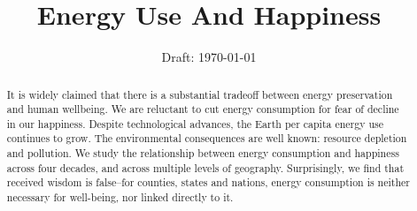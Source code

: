 \documentclass[10pt, letterpaper]{article}
\date{Draft: {}\today}
\title{ %
%  
Energy Use And Happiness%
}
\author{
}
\begin{document}



\maketitle
\vspace{-.4in}
\begin{center}
\end{center}

\begin{abstract}
\noindent  


It is widely claimed that there is a substantial tradeoff between energy
 preservation and human wellbeing. We are reluctant to cut energy
 consumption for fear of decline in our happiness. 
Despite technological advances, the Earth per capita energy use continues to grow.
The environmental consequences %
are well known:
resource depletion and pollution. %
%
 We study the relationship between energy consumption and happiness across four decades, and across multiple levels of geography.  Surprisingly, we find that received wisdom is false--for counties, states and nations, energy consumption is neither necessary for well-being, nor linked directly to it. 



\end{abstract}


\vspace{.15in} 

\vspace{.15in} 
\end{document}
